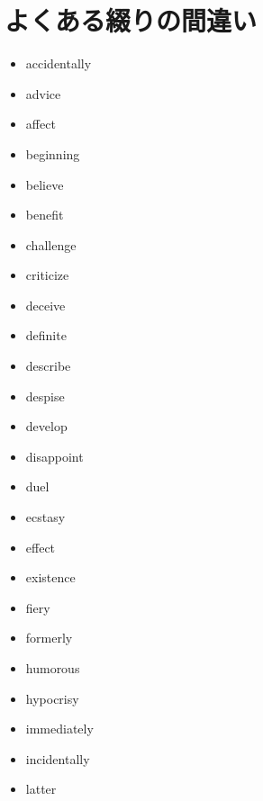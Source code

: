 \chapter{よくある綴りの間違い}
\begin{itemize}

\item accidentally

\item advice

\item affect

\item beginning

\item believe

\item benefit

\item challenge

\item criticize

\item deceive

\item definite

\item describe

\item despise

\item develop

\item disappoint

\item duel

\item ecstasy

\item effect

\item existence

\item fiery

\item formerly

\item humorous

\item hypocrisy

\item immediately

\item incidentally

\item latter


\end{itemize}
